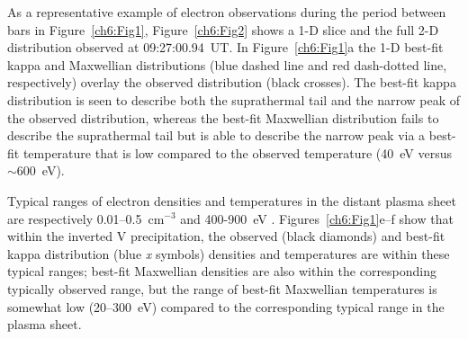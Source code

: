   \begin{figure}
    \centering
  \end{figure}


  As a representative example of electron observations during the period between
  bars in Figure~\ref{ch6:Fig1}, Figure~\ref{ch6:Fig2} shows a 1-D slice and the
  full 2-D distribution observed at 09:27:00.94~UT.  In Figure~\ref{ch6:Fig1}a
  the 1-D best-fit kappa and Maxwellian distributions (blue dashed line and red
  dash-dotted line, respectively) overlay the observed distribution (black
  crosses). The best-fit kappa distribution is seen to describe both the
  suprathermal tail and the narrow peak of the observed distribution, whereas
  the best-fit Maxwellian distribution fails to describe the suprathermal tail
  but is able to describe the narrow peak via a best-fit temperature that is low
  compared to the observed temperature (40~eV versus $\sim$600~eV).

  Typical ranges of electron densities and temperatures in the distant plasma
  sheet are respectively 0.01--0.5~cm$^{-3}$ and 400-900~eV
  \citep{Kletzing2003,Paschmann2003}. Figures~\ref{ch6:Fig1}e--f show that
  within the inverted V precipitation, the observed (black diamonds) and
  best-fit kappa distribution (blue \emph{x} symbols) densities and temperatures
  are within these typical ranges; best-fit Maxwellian densities are also within
  the corresponding typically observed range, but the range of best-fit
  Maxwellian temperatures is somewhat low (20--300~eV) compared to the
  corresponding typical range in the plasma sheet.


